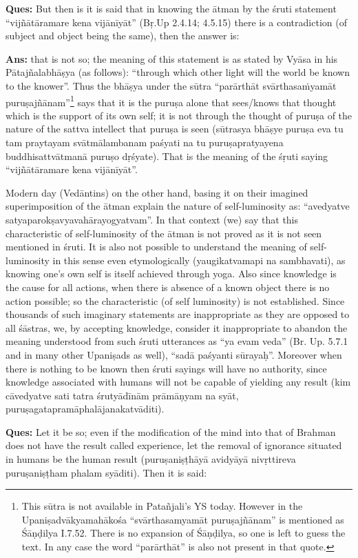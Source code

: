 \textbf{Ques:} But then is it is said that in knowing the ātman by the śruti statement “vijñātāramare kena vijānīyāt” (Bṛ.Up 2.4.14; 4.5.15) there is a contradiction (of subject and object being the same), then the answer is:

\textbf{Ans:} that is not so; the meaning of this statement is as stated by Vyāsa in his Pātajñalabhāṣya (as follows): “through which other light will the world be known to the knower”. Thus the bhāṣya under the sūtra “parārthāt svārthasaṁyamāt puruṣajñānam”\footnote{This sūtra is not available in Patañjali’s YS today. However in the Upaniṣadvākyamahākośa “svārthasamyamāt puruṣajñānam” is mentioned as Śāṇḍilya I.7.52. There is no expansion of Śāṇḍilya, so one is left to guess the text. In any case the word “parārthāt” is also not present in that quote.} says that it is the puruṣa alone that sees/knows that thought which is the support of its own self; it is not through the thought of puruṣa    of the nature of the sattva intellect that puruṣa is seen (sūtrasya bhāṣye puruṣa eva tu tam praytayam svātmālambanam paśyati na tu puruṣapratyayena buddhisattvātmanā puruṣo dṛśyate). That is the meaning of the śṛuti saying “vijñātāramare kena vijānīyāt”.

Modern day (Vedāntins) on the other hand, basing it on their imagined superimposition of the ātman explain the nature of self-luminosity as: “avedyatve satyaparokṣavyavahārayogyatvam”. In that context (we) say that this characteristic of self-luminosity of the ātman is not proved as it is not seen mentioned in śruti. It is also not possible to understand the meaning of self-luminosity in this sense even etymologically (yaugikatvamapi na sambhavati), as knowing one’s own self is itself achieved through yoga. Also since knowledge is the cause for all actions, when there is absence of a known object there is no action possible; so the characteristic (of self luminosity) is not established.   Since thousands of such imaginary statements are inappropriate as they are opposed to all śāstras, we, by accepting knowledge, consider it inappropriate to abandon the meaning understood from such śruti utterances as “ya evam veda” (Br. Up. 5.7.1 and in many other Upaniṣads as well), “sadā paśyanti sūrayaḥ”. Moreover when there is nothing to be known then śruti sayings will have no authority, since knowledge associated with humans will not be capable of yielding any result (kim cāvedyatve sati tatra śrutyādīnām prāmāṇyam na syāt, puruṣagatapramāphalājanakatvāditi).

\textbf{Ques:} Let it be so; even if the modification of the mind into that of Brahman does not have the result called experience, let the removal of ignorance situated in humans be the human result (puruṣaniṣṭhāyā avidyāyā nivṛttireva puruṣaniṣṭham phalam syāditi). Then it is said: 

